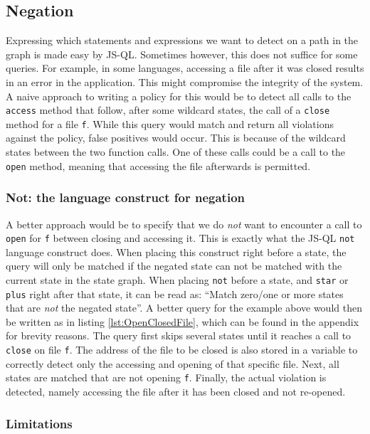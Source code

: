 \subsection{Negation}

Expressing which statements and expressions we want to detect on a path in the graph is made easy by JS-QL. Sometimes however, this does not suffice for some queries. For example, in some languages, accessing a file after it was closed results in an error in the application. This might compromise the integrity of the system. A naive approach to writing a policy for this would be to detect all calls to the \texttt{access} method that follow, after some wildcard states, the call of a \texttt{close} method for a file \texttt{f}. While this query would match and return all violations against the policy, false positives would occur. This is because of the wildcard states between the two function calls. One of these calls could be a call to the \texttt{open} method, meaning that accessing the file afterwards is permitted.  

\subsubsection*{Not: the language construct for negation}

A better approach would be to specify that we do \textit{not} want to encounter a call to \texttt{open} for \texttt{f} between closing and accessing it. This is exactly what the JS-QL \texttt{not} language construct does. When placing this construct right before a state, the query will only be matched if the negated state can not be matched with the current state in the state graph. When placing \texttt{not} before a state, and \texttt{star} or \texttt{plus} right after that state, it can be read as: ``Match zero/one or more states that are \textit{not} the negated state''. A better query for the example above would then be written as in listing \ref{lst:OpenClosedFile}, which can be found in the appendix for brevity reasons. The query first skips several states until it reaches a call to \texttt{close} on file \texttt{f}. The address of the file to be closed is also stored in a variable to correctly detect only the accessing and opening of that specific file. Next, all states are matched that are not opening \texttt{f}. Finally, the actual violation is detected, namely accessing the file after it has been closed and not re-opened. 

\subsubsection*{Limitations}

